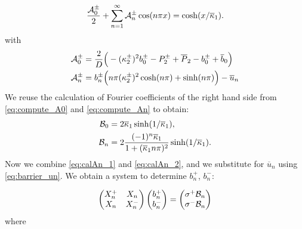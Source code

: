 \documentclass[sn-mathphys,Numbered]{sn-jnl}
\def\ol#1{\overline{#1}}
\begin{document}
\begin{equation}
    \frac{{\cal A}_0^\pm}{2} + \sum^{\infty}_{n=1} {\cal A}_n^\pm \cos (n\pi x) = \cosh(x/ \ol{\kappa}_1).
\end{equation}
with
\begin{align}
    \label{eq:calA0_1}
    {\cal A}_0^\pm &= \frac{2}{D}\Big(-(\kappa_2^\pm)^2 b_0^\pm - P_2^\pm + \ol{P}_2 - b_0^\pm + \ol{b}_0\Big)\\
    \label{eq:calAn_1}
    {\cal A}_n^\pm          &=  
    b_n^\pm \Big( 
            n \pi (\kappa_2^\pm)^2  \cosh(n \pi) 
            +  \sinh(n \pi)  
           \Big) 
        - \ol{u}_n   
\end{align}
We reuse the calculation of Fourier coefficients of the right hand side from \eqref{eq:compute_A0} and \eqref{eq:compute_An} to obtain:
\begin{align}
    \label{eq:calA0_2}
    {\cal B}_0 &= 2 \ol{\kappa}_1 \sinh( 1/\ol{\kappa}_1 ), \\
    \label{eq:calAn_2}
    {\cal B}_n &=  2 \frac{(-1)^n    \ol{\kappa}_1}{1+(\ol{\kappa}_1 n \pi)^2}\sinh(1/\ol{\kappa}_1).
\end{align}
%
Now we combine \eqref{eq:calAn_1} and \eqref{eq:calAn_2}, and we substitute for $\ol{u}_n$ using \eqref{eq:barrier_un}.
We obtain a system to determine $b_n^+$, $b_n^-$:

\begin{equation}
    \label{eq:an_system}
    \begin{pmatrix} 
            X_n^+ & X_n \\ 
            X_n & X_n^-
    \end{pmatrix}
    \begin{pmatrix} 
        b_n^+  \\ 
        b_n^-     
    \end{pmatrix}
     =  
    \begin{pmatrix} 
        \sigma^+{\cal B}_n \\ 
        \sigma^-{\cal B}_n
    \end{pmatrix}
\end{equation}
where
% 
\end{document}
